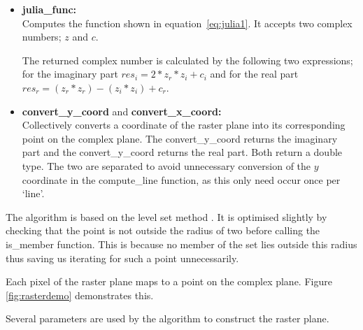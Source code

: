 \begin{itemize}
\item \textbf{julia\_func:} \\
            Computes the function shown in equation~\ref{eq:julia1}. It accepts two complex numbers; \(z\) and \(c\).
            
            The returned complex number is calculated by the following two expressions;
            for the imaginary part \(res_i = 2 * z_r * z_i + c_i\) and for the real part \(res_r = (z_r * z_r) - (z_i * z_i) + c_r\).

\item \textbf{convert\_y\_coord} and \textbf{convert\_x\_coord:} \\
            Collectively converts a coordinate of the raster plane into its corresponding point on the complex plane.
            The convert\_y\_coord returns the imaginary part and the convert\_y\_coord returns the real part.
            Both return a double type.
            The two are separated to avoid unnecessary conversion of the \(y\) coordinate in the compute\_line function,
            as this only need occur once per `line'.
\end{itemize}

The algorithm is based on the level set method \cite[p.~188]{fractimg}.
It is optimised slightly by checking that the point is not outside the radius of two before 
calling the is\_member function. This is because no member of the set lies outside this radius
thus saving us iterating for such a point unnecessarily.  



Each pixel of the raster plane maps to a point on the complex plane. Figure \ref{fig:rasterdemo} demonstrates
this. 

Several parameters are used by the algorithm to construct the raster plane.


